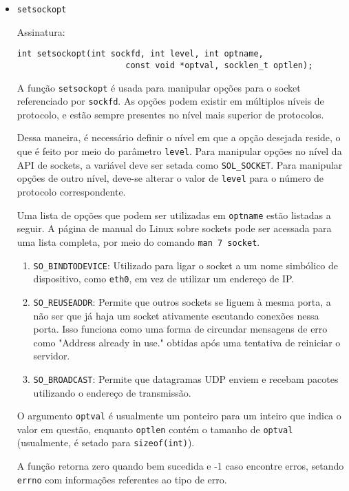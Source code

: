 \documentclass[a4paper,10pt]{article}
\begin{document}
\begin{itemize}
\item {\tt setsockopt}

Assinatura:
\begin{lstlisting}
int setsockopt(int sockfd, int level, int optname,
                      const void *optval, socklen_t optlen);
\end{lstlisting}

A função {\tt setsockopt} é usada para manipular opções para o socket referenciado por {\tt sockfd}. As opções podem existir em múltiplos níveis de protocolo, e estão sempre presentes no nível mais superior de protocolos.

Dessa maneira, é necessário definir o nível em que a opção desejada reside, o que é feito por meio do parâmetro {\tt level}. Para manipular opções no nível da API de sockets, a variável deve ser setada como {\tt SOL\_SOCKET}. Para manipular opções de outro nível, deve-se alterar o valor de {\tt level} para o número de protocolo correspondente.

Uma lista de opções que podem ser utilizadas em {\tt optname} estão listadas a seguir. A página de manual do Linux sobre sockets pode ser acessada para uma lista completa, por meio do comando {\tt man 7 socket}.

\begin{enumerate}
\item {\tt SO\_BINDTODEVICE}: Utilizado para ligar o socket a um nome simbólico de dispositivo, como {\tt eth0}, em vez de utilizar um endereço de IP.

\item {\tt SO\_REUSEADDR}: Permite que outros sockets se liguem à mesma porta, a não ser que já haja um socket ativamente escutando conexões nessa porta. Isso funciona como uma forma de circundar mensagens de erro como "Address already in use." obtidas após uma tentativa de reiniciar o servidor.

\item {\tt SO\_BROADCAST}: Permite que datagramas UDP enviem e recebam pacotes utilizando o endereço de transmissão.
\end{enumerate}

O argumento {\tt optval} é usualmente um ponteiro para um inteiro que indica o valor em questão, enquanto {\tt optlen} contém o tamanho de {\tt optval} (usualmente, é setado para {\tt sizeof(int)}).

A função retorna zero quando bem sucedida e -1 caso encontre erros, setando {\tt errno} com informações referentes ao tipo de erro.

\end{itemize}
\end{document}
